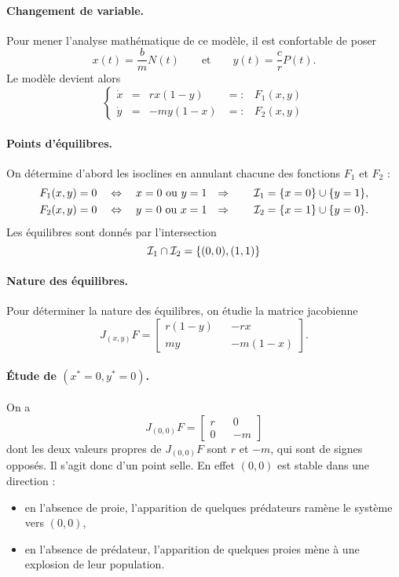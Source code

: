 \paragraph*{Changement de variable.}
Pour mener l'analyse mathématique de ce modèle, il est confortable de poser
$$
x(t) = \frac{b}m N(t)
\qquad \text{et} \qquad
y(t) = \frac{c}r P(t).
$$
Le modèle devient alors
$$
\left\{\begin{array}{rcrcl} 
  \dot x & = & r x (1-y) & =: & F_1(x, y) \\
  \dot y & = & -m y (1-x) & =: & F_2(x, y)
\end{array}\right.
$$

\paragraph*{Points d'équilibres.}
On détermine d'abord les isoclines en annulant chacune des fonctions $F_1$ et $F_2$ :
\begin{align*}
  F_1(x, y) & = 0 \quad \Leftrightarrow \quad x = 0 \text{ ou } y = 1 &
  \Rightarrow \qquad \mathcal{I}_1 & = \{x = 0\} \cup \{y = 1\}, \\
  F_2(x, y) & = 0 \quad \Leftrightarrow \quad y = 0 \text{ ou } x = 1 &
  \Rightarrow \qquad \mathcal{I}_2 & = \{x = 1\} \cup \{y = 0\}.
\end{align*}
Les équilibres sont donnés par l'intersection 
$$
\mathcal{I}_1 \cap \mathcal{I}_2 = \{(0, 0), (1, 1)\}
$$

\paragraph*{Nature des équilibres.}
Pour déterminer la nature des équilibres, on étudie la matrice jacobienne
$$
J_{(x, y)}F = 
  \left[\begin{array}{ccc} 
    r (1-y) & & -r x \\
    m y & & -m (1-x)
  \end{array}\right].
$$

\paragraph*{\'Etude de $(x^* = 0, y^* = 0)$.}
On a 
$$
J_{(0, 0)}F = 
  \left[\begin{array}{ccc} 
    r  & & 0 \\
    0 & & -m 
  \end{array}\right]
$$
dont les deux valeurs propres de $J_{(0, 0)}F$ sont $r$ et $-m$, qui sont de signes opposés. Il s'agit donc d'un point selle. En effet $(0, 0)$ est stable dans une direction : 
\begin{itemize}
  \item en l'absence de proie, l'apparition de quelques prédateurs ramène le système vers $(0, 0)$, 
  \item en l'absence de prédateur, l'apparition de quelques proies mène à une explosion de leur population.
\end{itemize}
  
